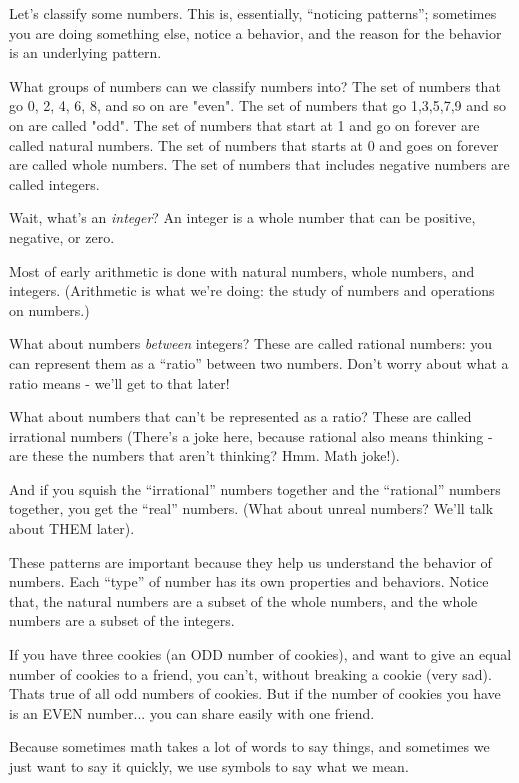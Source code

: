 Let's classify some numbers. This is, essentially, ``noticing patterns''; sometimes you are doing
something else, notice a behavior, and the reason for the behavior is an underlying pattern.

What groups of numbers can we classify numbers into?
The set of numbers that go 0, 2, 4, 6, 8, and so on are "even".
The set of numbers that go 1,3,5,7,9 and so on are called "odd". 
The set of numbers that start at 1 and go on forever are called natural numbers.
The set of numbers that starts at 0 and goes on forever are called whole numbers.
The set of numbers that includes negative numbers are called integers.

Wait, what's an \textit{integer}? An integer is a whole number that can be positive, negative, or zero.

Most of early arithmetic is done with natural numbers, whole numbers, and integers. (Arithmetic is what we're doing: the study of numbers and operations on numbers.)


What about numbers \textit{between} integers? These are called rational numbers: you can represent them as
a ``ratio'' between two numbers.
Don't worry about what a ratio means - we'll get to that later!

What about numbers that can't be represented as a ratio? These are called irrational numbers (There's a joke here, because rational also means thinking - are these the numbers that aren't thinking? Hmm. Math joke!).

And if you squish the ``irrational'' numbers together and the ``rational'' numbers together, you get the ``real'' numbers. (What about unreal numbers? We'll talk about THEM later).

These patterns are important because they help us understand the behavior of numbers. Each ``type'' of number has its own properties and behaviors.
Notice that, the natural numbers are a subset of the whole numbers, and the whole numbers are a subset of the integers.

If you have three cookies (an ODD number of cookies), and want to give an equal number of cookies to a friend, you can't, without breaking a cookie (very sad). Thats true of all odd numbers of cookies. But if the number of cookies you have is an EVEN number... you can share easily with one friend. 

Because sometimes math takes a lot of words to say things, and sometimes we just want to say it quickly, we use symbols to say what we mean. 


